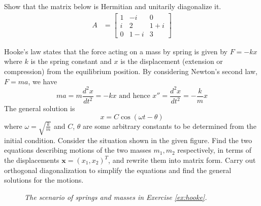 \begin{Exercise}
Show that the matrix below is Hermitian and unitarily diagonalize it.
\begin{align*}
A &=
\begin{bmatrix}
1 & -i & 0 \\
i & 2 & 1+i \\
0 & 1-i & 3 
\end{bmatrix}
\end{align*}
\end{Exercise}

\begin{Exercise}
\label{ex:hooke}
Hooke's law states that the force acting on a mass by spring is given by $F = -kx$ where $k$ is the spring constant and $x$ is the displacement (extension or compression) from the equilibrium position. By considering Newton's second law, $F = ma$, we have
\begin{equation*}
ma = m\frac{d^2x}{dt^2} = -kx\text{ and hence }x'' = \frac{d^2x}{dt^2} = -\frac{k}{m}x
\end{equation*}
The general solution is
\begin{equation*}
x = C\cos(\omega t - \theta)
\end{equation*}
where $\omega = \sqrt{\frac{k}{m}}$ and $C$, $\theta$ are some arbitrary constants to be determined from the initial condition. Consider the situation shown in the given figure. Find the two equations describing motions of the two masses $m_1, m_2$ respectively, in terms of the displacements $\textbf{x} = (x_1, x_2)^T$, and rewrite them into matrix form. Carry out orthogonal diagonalization to simplify the equations and find the general solutions for the motions.
\begin{figure}
\centering
{}  
\caption{\textit{The scenario of springs and masses in Exercise \ref{ex:hooke}.}}
\end{figure}
\end{Exercise}